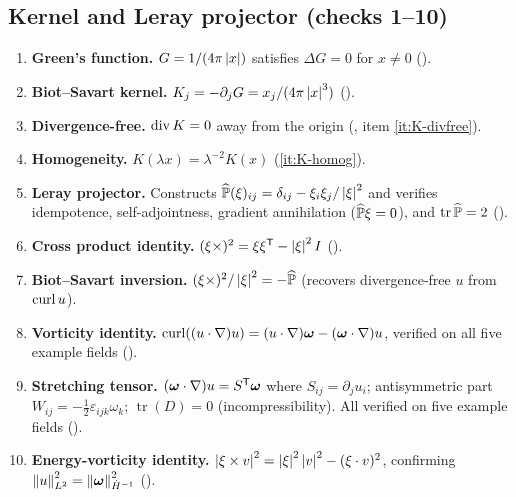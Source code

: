 \subsection{Kernel and Leray projector (checks 1--10)}\label{sec:sympy-ch03-kernel}

\begin{enumerate}[label=(\roman*)]
  \item \textbf{Green's function.}  $G = 1/(4\pi\left\lvert x \right\rvert)$ satisfies
    $\Delta G = 0$ for $x \neq 0$ ().

  \item \textbf{Biot--Savart kernel.}  $K_j = -\partial_j G = x_j/(4\pi\left\lvert x \right\rvert^3)$
    ().

  \item \textbf{Divergence-free.}  $\operatorname{div} K = 0$ away from the origin
    (, item \ref{it:K-divfree}).

  \item \textbf{Homogeneity.}  $K(\lambda x) = \lambda^{-2} K(x)$
    (\ref{it:K-homog}).

  \item \textbf{Leray projector.}  Constructs $\widehat{\mathbb{P}}(\xi)_{ij}
    = \delta_{ij} - \xi_i\xi_j/\left\lvert \xi \right\rvert^2$ and verifies idempotence,
    self-adjointness, gradient annihilation ($\widehat{\mathbb{P}}\xi = 0$),
    and $\operatorname{tr}\widehat{\mathbb{P}} = 2$
    ().

  \item \textbf{Cross product identity.}  $(\xi\times)^2 = \xi\xi^{\mathsf{T}} - \left\lvert \xi \right\rvert^2 I$
    ().

  \item \textbf{Biot--Savart inversion.}  $(\xi\times)^2/\left\lvert \xi \right\rvert^2 = -\widehat{\mathbb{P}}$
    (recovers divergence-free $u$ from $\operatorname{curl} u$).

  \item \textbf{Vorticity identity.}
    $\operatorname{curl}((u\cdot\nabla)u) = (u\cdot\nabla)\boldsymbol{\omega} - (\boldsymbol{\omega}\cdot\nabla)u$,
    verified on all five example fields ().

  \item \textbf{Stretching tensor.}
    $(\boldsymbol{\omega}\cdot\nabla)u = S^{\mathsf{T}}\boldsymbol{\omega}$ where $S_{ij} = \partial_j u_i$;
    antisymmetric part $W_{ij} = -\tfrac{1}{2}\varepsilon_{ijk}\omega_k$;
    $\operatorname{tr}(D) = 0$ (incompressibility).  All verified on five
    example fields ().

  \item \textbf{Energy-vorticity identity.}
    $\left\lvert \xi\times v \right\rvert^2 = \left\lvert \xi \right\rvert^2\left\lvert v \right\rvert^2 - (\xi\cdot v)^2$,
    confirming $\left\lVert u \right\rVert_{L^{2}}^2 = \left\lVert \boldsymbol{\omega} \right\rVert_{\dot{H}^{-1}}^2$
    ().
\end{enumerate}

